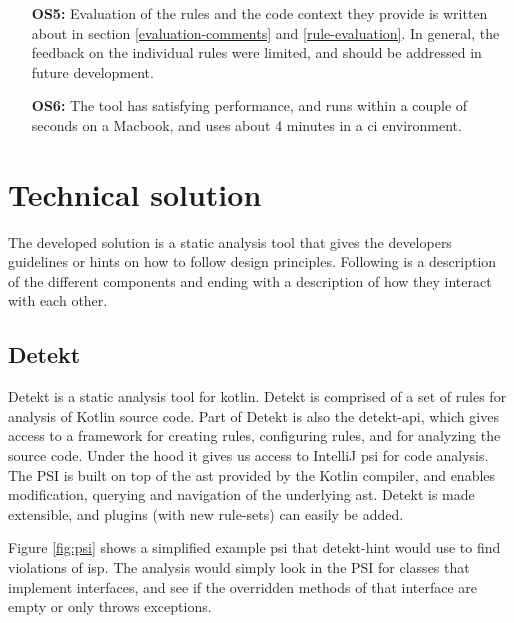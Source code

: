 \documentclass{report}
\begin{document}
\begin{itemize}
    \item [\textbf{OS5:}] Evaluation of the rules and the code context they provide is written about in section \ref{evaluation-comments} and \ref{rule-evaluation}. In general, the feedback on the individual rules were limited, and should be addressed in future development. 
    
    \item [\textbf{OS6:}] The tool has satisfying performance, and runs within a couple of seconds on a Macbook, and uses about 4 minutes in a \gls{ci} environment.

\end{itemize}

\section{Technical solution}
\label{technical-solution}

The developed solution is a static analysis tool that gives the developers guidelines or hints on how to follow design principles. Following is a description of the different components and ending with a description of how they interact with each other.


\subsection{Detekt}
Detekt is a static analysis tool for kotlin. Detekt is comprised of a set of rules for analysis of Kotlin source code. Part of Detekt is also the detekt-api, which gives access to a framework for creating rules, configuring rules, and for analyzing the source code. Under the hood it gives us access to IntelliJ \gls{psi} for code analysis. The PSI is built on top of the \gls{ast} provided by the Kotlin compiler, and enables modification, querying and navigation of the underlying \gls{ast}. Detekt is made extensible, and plugins (with new rule-sets) can easily be added.   

Figure \ref{fig:psi} shows a simplified example \gls{psi} that detekt-hint would use to find violations of \gls{isp}. The analysis would simply look in the PSI for classes that implement interfaces, and see if the overridden methods of that interface are empty or only throws exceptions. 
\end{document}
